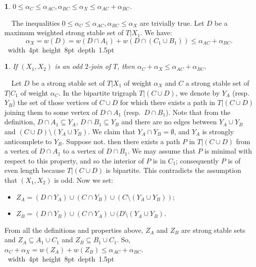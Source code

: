 \documentclass[11 pt] {article}
\newcommand\blackslug{\hbox{\hskip 1pt \vrule width 4pt height 8pt depth 1.5pt
        \hskip 1pt}}
\newcommand\bbox{\hfill \quad \blackslug \medbreak}
\newtheorem{lemma}[theorem]{}
\newcounter{claim}
\newcommand{\Proof}{\setcounter{claim}{0}\noindent{\bf Proof.}\ \ }
\begin{document}
\begin{lemma}
  \label{l:ineqbasic}
  $0 \leq \alpha_{C} \leq \alpha_{AC}, \alpha_{BC} \leq \alpha_{X}
  \leq \alpha_{AC}+\alpha_{BC}$.
\end{lemma}

\Proof The inequalities $0 \leq \alpha_{C} \leq \alpha_{AC},
\alpha_{BC} \leq \alpha_{X}$ are trivially true. Let $D$ be a maximum
weighted strong stable set of $T| X_1$.  We have:
  $$
  \alpha_{X} = w(D) = w(D\cap A_1) + w(D\cap (C_1 \cup B_1)) \leq
  \alpha_{AC} + \alpha_{BC}.
  $$
\bbox

\begin{lemma}
  \label{l:ineqOdd}
  If $(X_1, X_2)$ is an odd $2$-join of $T$, then $\alpha_{C}+\alpha_{X}
  \leq \alpha_{AC}+\alpha_{BC}$.
\end{lemma}

\Proof Let $D$ be a strong stable set of $T | X_1$ of weight
$\alpha_{X}$ and $C$ a strong stable set of $T| C_1$ of weight $\alpha_{C}$.
In the bipartite trigraph $T | (C\cup D)$, we denote by $Y_A$
(resp.\ $Y_B$) the set of those vertices of $C\cup D$ for which there
exists a path in $T | (C \cup D)$ joining them to some vertex of
$D\cap A_1$ (resp.\ $D \cap B_1$).  Note that from the definition, $D
\cap A_1 \subseteq Y_A$, $D \cap B_1 \subseteq Y_B$ and there are no edges 
between $Y_A \cup Y_B$ and $(C\cup D)\setminus (Y_A \cup Y_B)$.  We claim that
$Y_A \cap Y_B= \emptyset$, and $Y_A$ is strongly anticomplete to $Y_B$. 
Suppose not. then there exists a  path $P$  in $T | (C\cup D)$ from a vertex of 
$D \cap A_1$ to a vertex of $D \cap B_1$.  We may assume that $P$ is minimal 
with respect to this property, and so the  interior of $P$ is in $C_1$; 
consequently $P$ is of even length because $T | (C\cup D)$ is bipartite.  
This contradicts the assumption that $(X_1, X_2)$ is odd.  Now we set:

  \begin{itemize}
  \item $Z_A = (D \cap Y_A) \cup (C \cap Y_B) \cup (C \setminus (Y_A \cup
    Y_B))$;
  \item $Z_B = (D \cap Y_B) \cup (C \cap Y_A) \cup (D \setminus (Y_A \cup Y_B)$.
  \end{itemize}

  From all the definitions and properties above, $Z_A$ and $Z_B$ are
  strong stable sets and $Z_A \subseteq A_1 \cup C_1$ and $Z_B
  \subseteq B_1 \cup C_1$.  So, $\alpha_{C}+\alpha_{X} = w(Z_A) +
  w(Z_B) \leq \alpha_{AC}+\alpha_{BC}$.  \bbox
\end{document}
